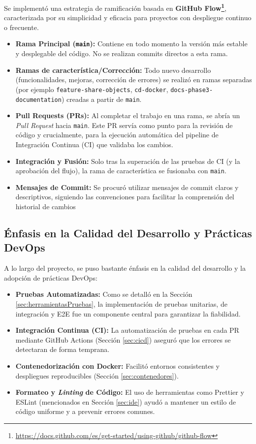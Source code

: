 Se implementó una estrategia de ramificación basada en \textbf{GitHub Flow\footnote{\url{https://docs.github.com/es/get-started/using-github/github-flow}}}, caracterizada por su simplicidad y eficacia para proyectos con despliegue continuo o frecuente.
    \begin{itemize}
        \item \textbf{Rama Principal (\texttt{main}):} Contiene en todo momento la versión más estable y desplegable del código. No se realizan commits directos a esta rama.
        \item \textbf{Ramas de característica/Corrección:} Todo nuevo desarrollo (funcionalidades, mejoras, corrección de errores) se realizó en ramas separadas (por ejemplo \texttt{feature-share-objects}, \texttt{cd-docker}, \texttt{docs-phase3-documentation}) creadas a partir de \texttt{main}.
        \item \textbf{Pull Requests (PRs):} Al completar el trabajo en una rama, se abría un \textit{Pull Request} hacia \texttt{main}. Este PR servía como punto para la revisión de código y crucialmente, para la ejecución automática del pipeline de Integración Continua (CI) que validaba los cambios.
        \item \textbf{Integración y Fusión:} Solo tras la superación de las pruebas de CI (y la aprobación del flujo), la rama de característica se fusionaba con \texttt{main}.
        \item \textbf{Mensajes de Commit:} Se procuró utilizar mensajes de commit claros y descriptivos, siguiendo las convenciones para facilitar la comprensión del historial de cambios
    \end{itemize}

\subsection{Énfasis en la Calidad del Desarrollo y Prácticas DevOps}
\label{sec:calidadDevops}

A lo largo del proyecto, se puso bastante énfasis en la calidad del desarrollo y la adopción de prácticas DevOps:
    \begin{itemize}
        \item \textbf{Pruebas Automatizadas:} Como se detalló en la Sección \ref{sec:herramientasPruebas}, la implementación de pruebas unitarias, de integración y E2E fue un componente central para garantizar la fiabilidad.
        \item \textbf{Integración Continua (CI):} La automatización de pruebas en cada PR mediante GitHub Actions (Sección \ref{sec:cicd}) aseguró que los errores se detectaran de forma temprana.
        \item \textbf{Contenedorización con Docker:} Facilitó entornos consistentes y despliegues reproducibles (Sección \ref{sec:contenedores}).
        \item \textbf{Formateo y \textit{Linting} de Código:} El uso de herramientas como Prettier y ESLint (mencionados en Sección \ref{sec:ide}) ayudó a mantener un estilo de código uniforme y a prevenir errores comunes.
    \end{itemize}